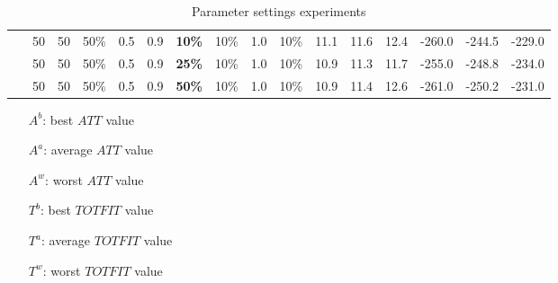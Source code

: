 \begin{table}
\begin{tabular}{|l|l|l|l|l|l|l|l|l|l||l|l|l|l|l|l|}
    ~ & 50 & 50 & 50\% & 0.5 & 0.9 & \textbf{10\%} & 10\% & 1.0 & 10\% &  11.1 & 11.6 & 12.4 & -260.0 & -244.5 & -229.0 \\
    ~ & 50 & 50 & 50\% & 0.5 & 0.9 & \textbf{25\%} & 10\% & 1.0 & 10\% &  10.9 & 11.3 & 11.7 & -255.0 & -248.8 & -234.0 \\
    ~ & 50 & 50 & 50\% & 0.5 & 0.9 & \textbf{50\%} & 10\% & 1.0 & 10\% &  10.9 & 11.4 & 12.6 & -261.0 & -250.2 & -231.0 \\
    \hline
    \end{tabular}
    \caption {Parameter settings experiments} 
    \begin{itemize}[noitemsep]
    \item[$A^b$:] best $ATT$ value
    \item[$A^a$:] average $ATT$ value
    \item[$A^w$:] worst $ATT$ value
    \item[$T^b$:] best $TOTFIT$ value
    \item[$T^a$:] average $TOTFIT$ value
    \item[$T^w$:] worst $TOTFIT$ value
    \end{itemize}
    \label{table:parameterSettingsLALLA}
\end{table}

